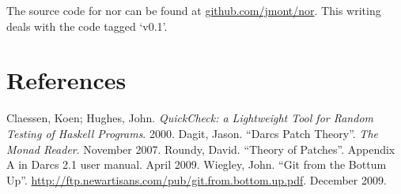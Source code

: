 \documentclass[]{article}
\begin{document}
The source code for nor can be found at
\href{https://github.com/jmont/nor}{github.com/jmont/nor}. This writing
deals with the code tagged `v0.1'.

\section{References}

Claessen, Koen; Hughes, John. \emph{QuickCheck: a Lightweight Tool for
Random Testing of Haskell Programs}. 2000. Dagit, Jason. ``Darcs Patch
Theory''. \emph{The Monad Reader}. November 2007. Roundy, David.
``Theory of Patches''. Appendix A in Darcs 2.1 user manual. April 2009.
Wiegley, John. ``Git from the Bottum Up''.
\url{http://ftp.newartisans.com/pub/git.from.bottom.up.pdf}. December
2009.
\end{document}
